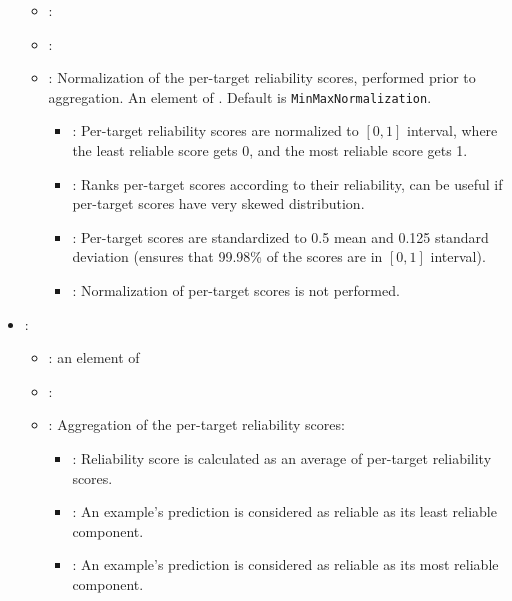 \begin{itemize}
\begin{itemize}
                \item \optionPossibleValues{}: 
                \item \optionDefaultValue{}: 
                \item \optionDescrption{}: Normalization of the per-target reliability scores, performed prior to aggregation. An element of . Default is {\tt MinMaxNormalization}.
                \begin{itemize}
                    \item {}: Per-target reliability scores are normalized to $[0,1]$ interval, where the least reliable score gets 0, and the most reliable score gets 1.
                    \item {}: Ranks per-target scores according to their reliability, can be useful if per-target scores have very skewed distribution.
                    \item {}: Per-target scores are standardized to 0.5 mean and 0.125 standard deviation (ensures that 99.98\% of the scores are in $[0,1]$ interval).
                    \item {}: Normalization of per-target scores is not performed.
                \end{itemize}
           \end{itemize}
    \item {}:
           \begin{itemize}
                \item \optionPossibleValues{}: an element of 
                \item \optionDefaultValue{}: 
                \item \optionDescrption{}:  Aggregation of the per-target reliability scores:
                	\begin{itemize}
                    \item {}: Reliability score is calculated as an average of per-target reliability scores.
                    \item {}: An example's prediction is considered as reliable as its least reliable component.
                    \item {}: An example's prediction is considered as reliable as its most reliable component.

\end{itemize}
\end{itemize}
\end{itemize}
